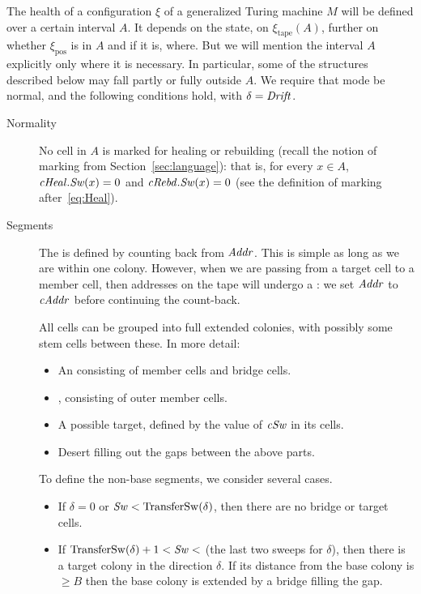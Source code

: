 \documentclass[12pt]{memoir}
\renewcommand{\ge}{\geq}
\newcommand{\fld}[1]{\ensuremath{\textit{#1\/}}}
\def\B{B}
\newcommand{\pos}{\mathrm{pos}}
\newcommand{\Addr}{\fld{Addr}}
\newcommand{\cAddr}{\fld{cAddr}}
\newcommand{\Drift}{\fld{Drift}}
\newcommand{\cHeal}{\fld{cHeal}}
\newcommand{\cRebd}{\fld{cRebd}}
\newcommand{\Sweep}{\fld{Sw}}
\newcommand{\cSweep}{\fld{cSw}}
\newcommand{\tape}{\mathrm{tape}}
\newcommand{\TransferSw}{\mathrm{TransferSw}}
\begin{document}
\begin{definition}\label{def:healthy}
The health of a configuration \( \xi \) of a generalized Turing machine 
\( M \) will be defined over a certain interval \( A \).
It depends on the state, 
on \( \xi_{\tape}(A) \), further on whether \( \xi_{\pos} \) is in \( A \) and
if it is, where.
But we will mention the interval \( A \) explicitly only where it is necessary.
In particular, some of the structures described below may fall partly or fully
outside \( A \).
We require that mode be normal, and the following conditions hold, with \( \delta=\Drift \).

\begin{description}

\item[Normality]
  No cell in \( A \) is marked for healing or rebuilding (recall the notion of marking from
Section~\ref{sec:language}):
  that is, for every \( x \in A \), \( \cHeal.\Sweep(x) = 0 \) and
  \( \cRebd.\Sweep(x) = 0 \)  (see the definition of marking after~\eqref{eq:Heal}).

\item[Segments]
  The  is defined by counting back from \( \Addr \).
This is simple as long as we are within one colony.
However, when we are passing from a target cell to a member cell, then addresses on
the tape will undergo a : we set \( \Addr \) to \( \cAddr \) before
continuing the count-back.

  All cells can be grouped into full extended colonies,
  with possibly some stem cells between these.
  In more detail:
  \begin{itemize}
  \item An  consisting of member cells and bridge cells.
  \item {}, consisting of outer member cells.
  \item A possible target, defined by the value of \( \cSweep \) in its cells.
  \item Desert filling out the gaps between the above parts.
  \end{itemize}

  To define the non-base segments, we consider several cases.
  \begin{itemize}
  \item 
    If \( \delta=0 \) or \( \Sweep < \TransferSw(\delta) \), 
    then there are no bridge or target cells.

  \item If \( \TransferSw(\delta) +1 < \Sweep <  \) (the last two sweeps for \( \delta \)),
    then there is a target colony in the direction \( \delta \).
    If its distance from the base colony is \( \ge\B \) then the base
    colony is extended by a bridge filling the gap.
    

\end{itemize}
\end{description}
\end{definition}
\end{document}
